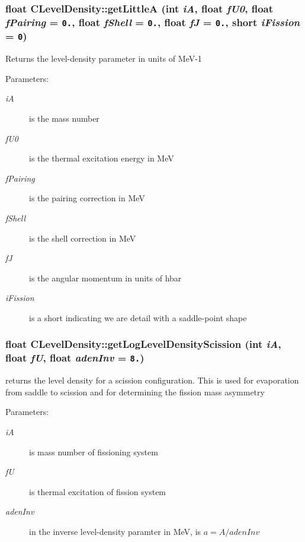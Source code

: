 \subsubsection{\setlength{\rightskip}{0pt plus 5cm}float CLevel\-Density::get\-Little\-A (int {\em i\-A}, float {\em f\-U0}, float {\em f\-Pairing} = {\tt 0.}, float {\em f\-Shell} = {\tt 0.}, float {\em f\-J} = {\tt 0.}, short {\em i\-Fission} = {\tt 0})}\label{classCLevelDensity_58fc95dcb009f6594ccc069026c03e9c}


Returns the level-density parameter in units of Me\-V-1 \begin{Desc}
\item[Parameters:]
\begin{description}
\item[{\em i\-A}]is the mass number \item[{\em f\-U0}]is the thermal excitation energy in Me\-V \item[{\em f\-Pairing}]is the pairing correction in Me\-V \item[{\em f\-Shell}]is the shell correction in Me\-V \item[{\em f\-J}]is the angular momentum in units of hbar \item[{\em i\-Fission}]is a short indicating we are detail with a saddle-point shape \end{description}
\end{Desc}
\subsubsection{\setlength{\rightskip}{0pt plus 5cm}float CLevel\-Density::get\-Log\-Level\-Density\-Scission (int {\em i\-A}, float {\em f\-U}, float {\em aden\-Inv} = {\tt 8.})}\label{classCLevelDensity_ad13f8bf607fc24ad3b1f3b6258a507b}


returns the level density for a scission configuration. This is used for evaporation from saddle to scission and for determining the fission mass asymmetry \begin{Desc}
\item[Parameters:]
\begin{description}
\item[{\em i\-A}]is mass number of fissioning system \item[{\em f\-U}]is thermal excitation of fission system \item[{\em aden\-Inv}]in the inverse level-density paramter in Me\-V, is $a=A/adenInv$ \end{description}
\end{Desc}
